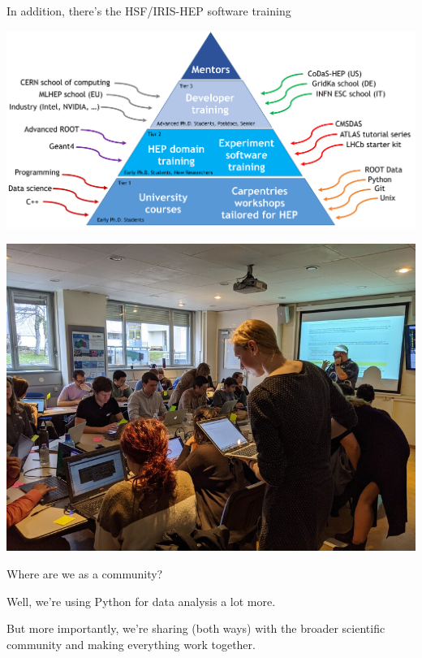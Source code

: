 \documentclass[aspectratio=169]{beamer}
\begin{document}
\begin{frame}{In addition, there's the HSF/IRIS-HEP software training}
\vspace{1.25 cm}

\mbox{\hspace{-0.75 cm}\includegraphics[width=\linewidth]{PLOTS/Training-Pyramid.png}}

\vspace{-7.75 cm}
\hfill \mbox{\includegraphics[width=4 cm]{PLOTS/instructor_mentor_small.jpg}\hspace{-1 cm}}
\vspace{7.75 cm}
\end{frame}

\begin{frame}{Where are we as a community?}
\Large

Well, we're using Python for data analysis a lot more.

\vspace{1 cm}
But more importantly, we're sharing (both ways) with the broader scientific community and making everything work together.
\end{frame}
\end{document}
